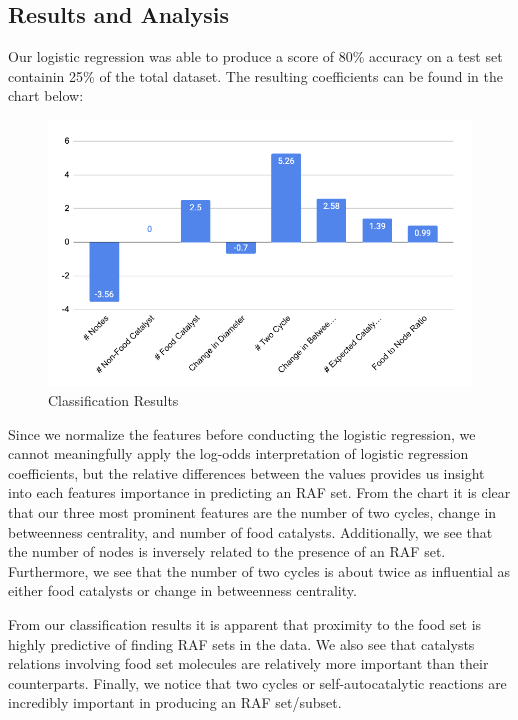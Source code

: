 \documentclass[11pt]{article}
\begin{document}
\subsection{Results and Analysis}

Our logistic regression was able to produce a score of 80\% accuracy on a test set containin 25\% of the total dataset. 
The resulting coefficients can be found in the chart below:

\begin{figure}[H]
    \centering
    \includegraphics[width=15cm]{classification}
    \caption{Classification Results}
\end{figure}

Since we normalize the features before conducting the logistic regression, we cannot meaningfully apply the log-odds interpretation of logistic regression coefficients, but the relative differences between the values provides us insight into each features importance in predicting an RAF set.
From the chart it is clear that our three most prominent features are the number of two cycles, change in betweenness centrality, and number of food catalysts. 
Additionally, we see that the number of nodes is inversely related to the presence of an RAF set.  
Furthermore, we see that the number of two cycles is about twice as influential as either food catalysts or change in betweenness centrality.  

From our classification results it is apparent that proximity to the food set is highly predictive of finding RAF sets in the data. 
We also see that catalysts relations involving food set molecules are relatively more important than their counterparts.
Finally, we notice that two cycles or self-autocatalytic reactions are incredibly important in producing an RAF set/subset.
\end{document}
